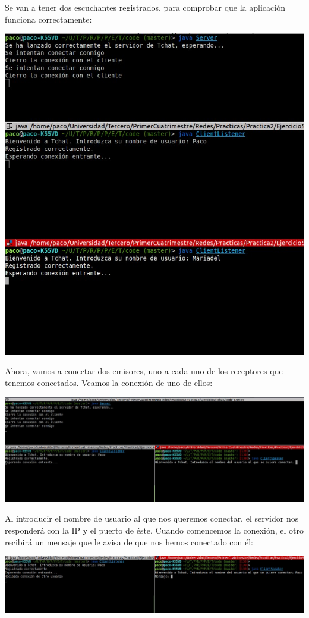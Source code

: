 \documentclass[12pt]{article}       %
\begin{document}
Se van a tener dos escuchantes registrados, para comprobar que la aplicación funciona correctamente:\\
\begin{center}
\includegraphics[scale=0.5]{images/Selection_004}
\end{center}

Ahora, vamos a conectar dos emisores, uno a cada uno de los receptores que tenemos conectados. Veamos la conexión de uno de ellos:\\
\begin{center}
\includegraphics[scale=0.3]{images/Selection_005}
\end{center}

Al introducir el nombre de usuario al que nos queremos conectar, el servidor nos responderá con la IP y el puerto de éste. Cuando comencemos la conexión, el otro recibirá un mensaje que le avisa de que nos hemos conectado con él:\\
\begin{center}
\includegraphics[scale=0.3]{images/Selection_006}
\end{center}
\end{document}
